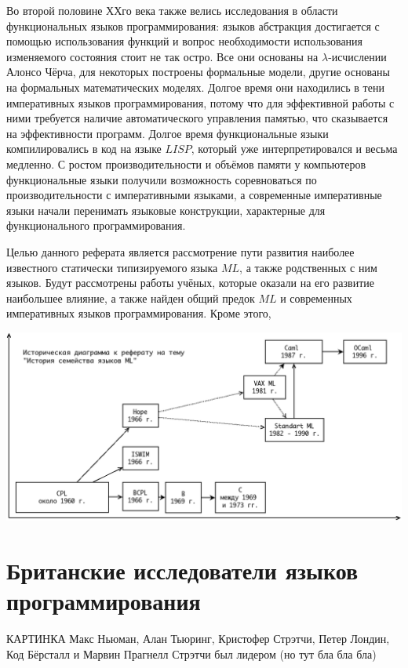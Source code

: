 \documentclass[14pt]{matmex-diploma-custom}
\begin{document}
Во второй половине ХХго века также велись исследования в области функциональных языков программирования: языков абстракция достигается с помощью использования функций и вопрос необходимости использования изменяемого состояния стоит не так остро. Все они основаны на $\lambda$-исчислении Алонсо Чёрча, для некоторых построены формальные модели, другие основаны на формальных математических моделях. Долгое время они находились в тени императивных языков программирования, потому что для эффективной работы с ними требуется наличие автоматического управления памятью, что сказывается на эффективности программ. Долгое время функциональные языки компилировались в код на языке $LISP$, который уже интерпретировался и весьма медленно. С ростом производительности и объёмов памяти у компьютеров функциональные языки получили возможность соревноваться по производительности с императивными языками, а современные императивные языки начали перенимать языковые конструкции, характерные для функционального программирования.

Целью данного реферата является рассмотрение пути развития наиболее известного статически типизируемого языка $ML$, а также родственных с ним языков. Будут рассмотрены работы учёных, которые оказали на его развитие наибольшее влияние, а также найден общий предок $ML$ и современных императивных языков программирования. Кроме этого,

%

\begin{center}
\includegraphics[angle=90,scale=0.585]{Diagram.png}
\end{center}

\section{Британские исследователи языков программирования}


КАРТИНКА
Макс Ньюман, Алан Тьюринг, Кристофер Стрэтчи, Петер Лондин, Код Бёрсталл и Марвин Прагнелл
Стрэтчи был лидером  (но тут бла бла бла)
\end{document}
